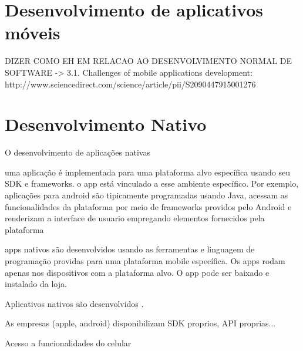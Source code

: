 \chapter{Desenvolvimento de aplicativos móveis} \label{cap:referencialteorico} 

DIZER COMO EH EM RELACAO AO DESENVOLVIMENTO NORMAL DE SOFTWARE
-> 3.1. Challenges of mobile applications development: http://www.sciencedirect.com/science/article/pii/S2090447915001276



\chapter{Desenvolvimento Nativo} \label{cap:desenvolvimentonativo}

O desenvolvimento de aplicações nativas 

uma aplicação é implementada para uma plataforma alvo específica usando seu SDK e frameworks.
o app está vinculado a esse ambiente específico.
Por exemplo, aplicações para android são tipicamente programadas usando Java, acessam as funcionalidades da plataforma
por meio de frameworks providos pelo Android e renderizam a interface de usuario empregando elementos fornecidos pela plataforma


apps nativos são desenvolvidos usando as ferramentas e linguagem de programação providas para uma plataforma mobile específica.
Os apps rodam apenas nos dispositivos com a plataforma alvo.
O app pode ser baixado e instalado da loja.

Aplicativos nativos são desenvolvidos \cite{kassas_taxonomy_2015}.


As empresas (apple, android) disponibilizam SDK proprios, API proprias...

Acesso a funcionalidades do celular


